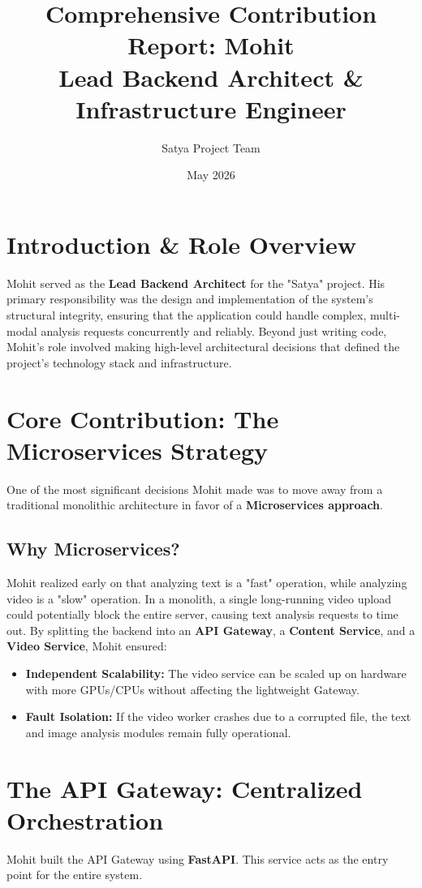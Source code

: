 \documentclass[12pt]{article}
\title{\textbf{Comprehensive Contribution Report: Mohit \\ Lead Backend Architect \& Infrastructure Engineer}}
\author{Satya Project Team}
\date{May 2026}
\begin{document}
\maketitle

\section{Introduction \& Role Overview}
Mohit served as the \textbf{Lead Backend Architect} for the "Satya" project. His primary responsibility was the design and implementation of the system's structural integrity, ensuring that the application could handle complex, multi-modal analysis requests concurrently and reliably. Beyond just writing code, Mohit's role involved making high-level architectural decisions that defined the project's technology stack and infrastructure.

\section{Core Contribution: The Microservices Strategy}
One of the most significant decisions Mohit made was to move away from a traditional monolithic architecture in favor of a \textbf{Microservices approach}. 

\subsection{Why Microservices?}
Mohit realized early on that analyzing text is a "fast" operation, while analyzing video is a "slow" operation. In a monolith, a single long-running video upload could potentially block the entire server, causing text analysis requests to time out. By splitting the backend into an \textbf{API Gateway}, a \textbf{Content Service}, and a \textbf{Video Service}, Mohit ensured:
\begin{itemize}
    \item \textbf{Independent Scalability:} The video service can be scaled up on hardware with more GPUs/CPUs without affecting the lightweight Gateway.
    \item \textbf{Fault Isolation:} If the video worker crashes due to a corrupted file, the text and image analysis modules remain fully operational.
\end{itemize}

\section{The API Gateway: Centralized Orchestration}
Mohit built the API Gateway using \textbf{FastAPI}. This service acts as the entry point for the entire system.
\end{document}
